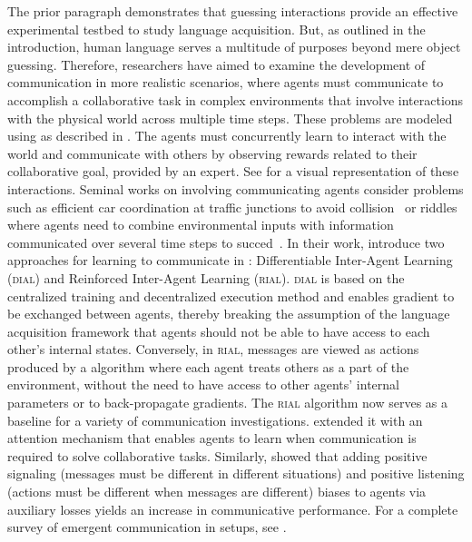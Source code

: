 The prior paragraph demonstrates that guessing interactions provide an effective experimental testbed to study language acquisition. But, as outlined in the introduction, human language serves a multitude of purposes beyond mere object guessing. Therefore, \ai researchers have aimed to examine the development of communication in more realistic scenarios, where agents must communicate to accomplish a collaborative task in complex environments that involve interactions with the physical world across multiple time steps. These problems are modeled using \marl as described in . The agents must concurrently learn to interact with the world and communicate with others by observing rewards related to their collaborative goal, provided by an expert. See  for a visual representation of these interactions. Seminal works on \marl involving communicating agents consider problems such as efficient car coordination at traffic junctions to avoid collision~\citep{sukhbaatar2016learning} or riddles where agents need to combine environmental inputs with information communicated over several time steps to succed~\citep{foerster2016learning}. In their work, \citet{foerster2016learning} introduce two approaches for learning to communicate in \marl: Differentiable Inter-Agent Learning (\textsc{dial}) and Reinforced Inter-Agent Learning (\textsc{rial}). \textsc{dial} is based on the centralized training and decentralized execution method and enables gradient to be exchanged between agents, thereby breaking the assumption of the language acquisition framework that agents should not be able to have access to each other's internal states. Conversely, in \textsc{rial}, messages are viewed as actions produced by a \rl algorithm where each agent treats others as a part of the environment, without the need to have access to other agents’ internal parameters or to back-propagate gradients. The \textsc{rial} algorithm now serves as a baseline for a variety of \marl communication investigations. \cite{jiang2018learning} extended it with an attention mechanism that enables agents to learn when communication is required to solve collaborative tasks.  Similarly, \citet{eccles2019biases} showed that adding positive signaling (messages must be different in different situations) and positive listening (actions must be different when messages are different) biases to agents via auxiliary losses yields an increase in communicative performance. For a complete survey of emergent communication in \marl setups, see \citet{zhu2022survey}.

